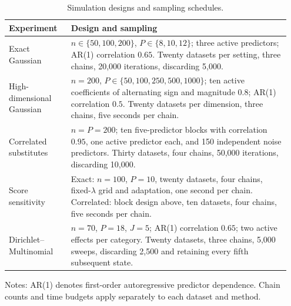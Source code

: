 \begin{table}[!t]
\centering
\caption{Simulation designs and sampling schedules.}
\label{tab:simulation_designs}
\fontsize{12}{9}\selectfont
\begin{tabular}{@{}>{\raggedright\arraybackslash}p{0.21\linewidth}>{\raggedright\arraybackslash}p{0.74\linewidth}@{}}
\toprule
Experiment & Design and sampling \\
\midrule
Exact Gaussian & $n\in\{50,100,200\}$, $P\in\{8,10,12\}$; three active predictors; AR(1) correlation $0.65$. Twenty datasets per setting, three chains, 20,000 iterations, discarding 5,000. \\
\addlinespace
High-dimensional Gaussian & $n=200$, $P\in\{50,100,250,500,1000\}$; ten active coefficients of alternating sign and magnitude $0.8$; AR(1) correlation $0.5$. Twenty datasets per dimension, three chains, five seconds per chain. \\
\addlinespace
Correlated substitutes & $n=P=200$; ten five-predictor blocks with correlation $0.95$, one active predictor each, and 150 independent noise predictors. Thirty datasets, four chains, 50,000 iterations, discarding 10,000. \\
\addlinespace
Score sensitivity & Exact: $n=100$, $P=10$, twenty datasets, four chains, fixed-$\lambda$ grid and adaptation, one second per chain. Correlated: block design above, ten datasets, four chains, five seconds per chain. \\
\addlinespace
Dirichlet--Multinomial & $n=70$, $P=18$, $J=5$; AR(1) correlation $0.65$; two active effects per category. Twenty datasets, three chains, 5,000 sweeps, discarding 2,500 and retaining every fifth subsequent state. \\
\bottomrule
\end{tabular}
\par\smallskip
\begin{minipage}{\linewidth}
\footnotesize
Notes: AR(1) denotes first-order autoregressive predictor dependence. Chain counts and time budgets apply separately to each dataset and method.
\end{minipage}
\end{table}
